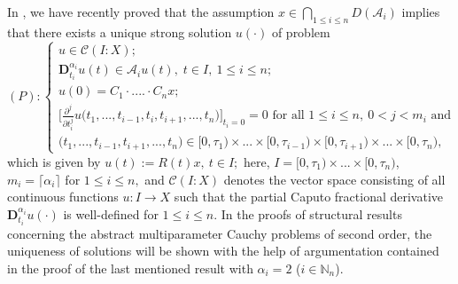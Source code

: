 \documentclass{amsart}
\theoremstyle{definition}
\theoremstyle{remark}
\numberwithin{equation}{section}
\begin{document}
In \cite[Theorem 8.1.23]{apsclcs}, we have recently proved that the assumption $x\in \bigcap_{1\leq i\leq n}D({\mathcal A}_{i} )$ implies that there exists a unique strong solution $u(\cdot) $ of problem
\[(P):\left\{
\begin{array}{l}
u\in {\mathcal C}(I  :X);\\
{\mathbf D}_{t_{i}}^{\alpha_{i}}u(t) \in {\mathcal A}_{i}u(t),\;t \in I,\ 1\leq i\leq n;\\
u(0)=C_{1}\cdot ....\cdot C_{n}x;\\ 
\Biggl[ \frac{\partial^{j}}{\partial t_{i}^{j}}u\bigl(t_{1},...,t_{i-1},t_{i},t_{i+1},...,t_{n}\bigr) \Biggr]_{t_{i}=0}=0
\mbox{ for all }  1\leq i\leq n,\ 0<j<m_{i}\mbox{ and }\\
\bigl(t_{1},...,t_{i-1},t_{i+1},...,t_{n}\bigr)\in [0,\tau_{1})\times ... \times [0,\tau_{i-1})\times [0,\tau_{i+1}) \times ... \times [0,\tau_{n}),
\end{array}
\right.
\]
which is given by
$
u(t):=R (t)x,\  t\in I;
$
here, $I=[0,\tau_{1}) \times ... \times [0,\tau_{n}) $, $m_{i}=\lceil \alpha_{i} \rceil$ for $1\leq i\leq n,$ and ${\mathcal C}(I: X)$ denotes the vector space consisting of all continuous functions $u : I\rightarrow  X$ such that the partial Caputo fractional derivative ${\mathbf D}_{t_{i}}^{\alpha_{i}}u(\cdot)$ is well-defined for $1\leq i\leq n.$ 
In the proofs of structural results concerning the abstract multiparameter Cauchy problems of second order, the uniqueness of solutions will be shown with the help of argumentation contained in the proof of the last mentioned result with $\alpha_{i}=2$ ($i\in {\mathbb N}_{n}$).
\end{document}
